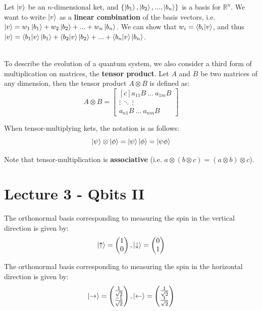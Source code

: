 \documentclass[12pt]{article}
\begin{document}
\noindent
Let $\ket{v}$ be an $n$-dimensional ket, and $\{ \ket{b_1}, \ket{b_2}, ... , \ket{b_n} \}$ is a basis for $\mathbb{R}^n$. 
We want to write $\ket{v}$ as a \textbf{linear combination} of the basis vectors, i.e. $\ket{v} = w_1\ket{b_1} + w_2\ket{b_2} + ... + w_n\ket{b_n}$.
We can show that $w_i = \braket{b_i | v}$, and thus $\ket{v} = \braket{b_1 | v}\ket{b_1} + \braket{b_2 | v}\ket{b_2} + ... + \braket{b_n | v}\ket{b_n}$.

\noindent
\\
To describe the evolution of a quantum system, we also consider a third form of multiplication on matrices, the \textbf{tensor product}.
Let $A$ and $B$ be two matrices of any dimension, then the tensor product $A \otimes B$ is defined as:
\[ A \otimes B = \begin{bmatrix*}[c]
    a_{11}B \ \dots \ a_{1m}B \\
    \vdots \ \ddots \ \vdots \\
    a_{n1}B \ \dots \ a_{nm}B
\end{bmatrix*} \]

\noindent
When tensor-multiplying kets, the notation is as follows:
\[ \ket{\psi} \otimes \ket{\phi} = \ket{\psi}\ket{\phi} = \ket{\psi\phi} \]

\noindent
Note that tensor-multiplication is \textbf{associative} (i.e. $a \otimes (b \otimes c) = (a \otimes b) \otimes c$).

%
%
\newpage
\section*{Lecture 3 - Qbits II}
The orthonormal basis corresponding to measuring the spin in the vertical direction is given by:
\[ \ket{\uparrow} = \begin{pmatrix}
    1 \\
    0
\end{pmatrix}, \ket{\downarrow} = \begin{pmatrix}
    0 \\
    1
\end{pmatrix} \]

\noindent
The orthonormal basis corresponding to measuring the spin in the horizontal direction is given by:
\[ \ket{\rightarrow} = \begin{pmatrix}
    \frac{1}{\sqrt{2}} \\
    \frac{-1}{\sqrt{2}}
\end{pmatrix}, \ket{\leftarrow} = \begin{pmatrix}
    \frac{1}{\sqrt{2}} \\
    \frac{1}{\sqrt{2}}
\end{pmatrix} \]
\end{document}
